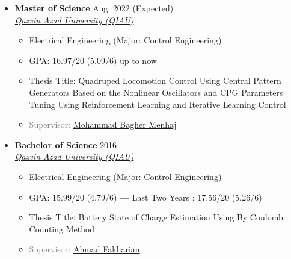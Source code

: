 \documentclass[10pt,a4paper,sans]{moderncv} %
\begin{document}
	\begin{itemize}[nosep]
		\item \textbf{Master of Science} \hfill Aug, 2022 (Expected)  \\ 
		\href{http://qiau.ac.ir/en/}{ \emph{Qazvin Azad University (QIAU)}} \hfill%
		
		\begin{itemize}[nosep, leftmargin=0.9cm ] %
			\item Electrical Engineering (Major: Control Engineering) %
	        \item GPA: 16.97/20 (5.09/6) up to now %
			\item Thesis Title: Quadruped Locomotion Control Using Central Pattern Generators Based on the Nonlinear Oscillators and CPG Parameters Tuning Using Reinforcement Learning and Iterative Learning Control %
			\item \textcolor{gray}{Supervisor: \href{https://scholar.google.com/citations?user=0EN-JbQAAAAJ}{Mohammad Bagher Menhaj}} %
		\end{itemize}
		
		\vspace{1em}
		
		\item \textbf{Bachelor of Science} \hfill 2016 \\
		\href{http://qiau.ac.ir/en/}{ \emph{Qazvin Azad University (QIAU)}} \hfill %
		\begin{itemize}[nosep, leftmargin=0.9cm ]
			\item Electrical Engineering (Major: Control Engineering)
			\item GPA: 15.99/20 (4.79/6) %
			\textbf{---} Last Two Years : 17.56/20 (5.26/6) %
			\item Thesis Title: Battery State of Charge Estimation Using By Coulomb Counting Method %
			\item \textcolor{gray}{Supervisor: \href{https://scholar.google.com/citations?user=bI_eOLAAAAAJ}{Ahmad Fakharian}}
		\end{itemize} %
	
	\end{itemize}
	
\end{document}
